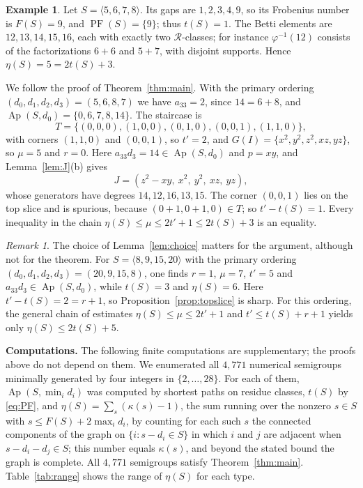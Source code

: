 \documentclass{amsart}
\theoremstyle{definition}
\newtheorem{example}[theorem]{Example}
\theoremstyle{remark}
\newtheorem{remark}[theorem]{Remark}
\numberwithin{equation}{section}
\newcommand{\cR}{\mathcal{R}}
\newcommand{\Ap}{\operatorname{Ap}}
\DeclareMathOperator{\PF}{PF}
\newcommand{\Apd}{\Ap(S,d_0)}
\begin{document}
\begin{example}\label{ex:5678}
Let $S=\langle5,6,7,8\rangle$. Its gaps are $1,2,3,4,9$, so its Frobenius number is $F(S)=9$, and $\PF(S)=\{9\}$; thus $t(S)=1$. The Betti elements are $12,13,14,15,16$, each with exactly two $\cR$-classes; for instance $\varphi^{-1}(12)$ consists of the factorizations $6+6$ and $5+7$, with disjoint supports. Hence $\eta(S)=5=2t(S)+3$.

We follow the proof of Theorem~\ref{thm:main}. With the primary ordering $(d_0,d_1,d_2,d_3)=(5,6,8,7)$ we have $a_{33}=2$, since $14=6+8$, and $\Apd=\{0,6,7,8,14\}$. The staircase is
\[
T=\{(0,0,0),(1,0,0),(0,1,0),(0,0,1),(1,1,0)\},
\]
with corners $(1,1,0)$ and $(0,0,1)$, so $t'=2$, and $G(I)=\{x^2,y^2,z^2,xz,yz\}$, so $\mu=5$ and $r=0$. Here $a_{33}d_3=14\in\Apd$ and $p=xy$, and Lemma~\ref{lem:J}(b) gives
\[
J=(z^2-xy,\ x^2,\ y^2,\ xz,\ yz),
\]
whose generators have degrees $14,12,16,13,15$. The corner $(0,0,1)$ lies on the top slice and is spurious, because $(0+1,0+1,0)\in T$; so $t'-t(S)=1$. Every inequality in the chain $\eta(S)\le\mu\le 2t'+1\le 2t(S)+3$ is an equality.
\end{example}

\begin{remark}\label{rem:ordering}
The choice of Lemma~\ref{lem:choice} matters for the argument, although not for the theorem. For $S=\langle8,9,15,20\rangle$ with the primary ordering $(d_0,d_1,d_2,d_3)=(20,9,15,8)$, one finds $r=1$, $\mu=7$, $t'=5$ and $a_{33}d_3\in\Apd$, while $t(S)=3$ and $\eta(S)=6$. Here $t'-t(S)=2=r+1$, so Proposition~\ref{prop:topslice} is sharp. For this ordering, the general chain of estimates $\eta(S)\le\mu\le2t'+1$ and $t'\le t(S)+r+1$ yields only $\eta(S)\le2t(S)+5$.
\end{remark}

\medskip\noindent\textbf{Computations.} The following finite computations are supplementary; the proofs above do not depend on them. We enumerated all $4{,}771$ numerical semigroups minimally generated by four integers in $\{2,\dots,28\}$. For each of them, $\Ap(S,\min_id_i)$ was computed by shortest paths on residue classes, $t(S)$ by \eqref{eq:PF}, and $\eta(S)=\sum_s(\kappa(s)-1)$, the sum running over the nonzero $s\in S$ with $s\le F(S)+2\max_id_i$, by counting for each such $s$ the connected components of the graph on $\{i : s-d_i\in S\}$ in which $i$ and $j$ are adjacent when $s-d_i-d_j\in S$; this number equals $\kappa(s)$, and beyond the stated bound the graph is complete. All $4{,}771$ semigroups satisfy Theorem~\ref{thm:main}. Table~\ref{tab:range} shows the range of $\eta(S)$ for each type.
\end{document}
